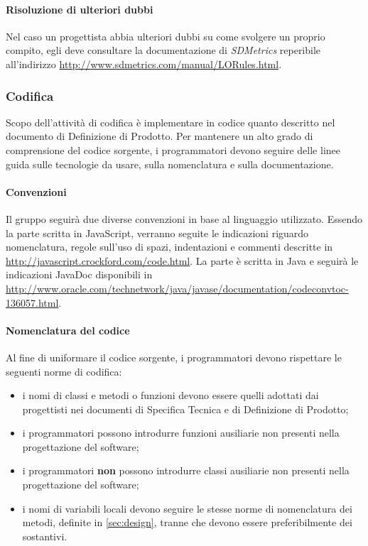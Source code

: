 \paragraph{Risoluzione di ulteriori dubbi} Nel caso un progettista abbia ulteriori dubbi su come svolgere un proprio compito, egli deve consultare la documentazione di \emph{SDMetrics} reperibile all'indirizzo \url{http://www.sdmetrics.com/manual/LORules.html}.

\subsubsection{Codifica} \label{sec:cod} Scopo dell'attività di codifica è implementare in codice quanto descritto nel documento di Definizione di Prodotto. Per mantenere un alto grado di comprensione del codice sorgente, i programmatori devono seguire delle linee guida sulle tecnologie da usare, sulla nomenclatura e sulla documentazione.

\paragraph{Convenzioni} \label{sec:conv} Il gruppo seguirà due diverse convenzioni in base al linguaggio utilizzato. Essendo la parte  scritta in JavaScript, verranno seguite le indicazioni riguardo nomenclatura, regole sull'uso di spazi, indentazioni e commenti descritte in \url{http://javascript.crockford.com/code.html}. La parte  è scritta in Java e seguirà le indicazioni JavaDoc disponibili in \url{http://www.oracle.com/technetwork/java/javase/documentation/codeconvtoc-136057.html}.

\paragraph{Nomenclatura del codice} Al fine di uniformare il codice sorgente, i programmatori devono rispettare le seguenti norme di codifica:
\begin{itemize}
	\item i nomi di classi e metodi o funzioni devono essere quelli adottati dai progettisti nei documenti di Specifica Tecnica e di Definizione di Prodotto;
	\item i programmatori possono introdurre funzioni ausiliarie non presenti nella progettazione del software;
	\item i programmatori \textbf{non} possono introdurre classi ausiliarie non presenti nella progettazione del software;
	\item i nomi di variabili locali devono seguire le stesse norme di nomenclatura dei metodi, definite in \ref{sec:design}, tranne che devono essere preferibilmente dei sostantivi.
\end{itemize}

